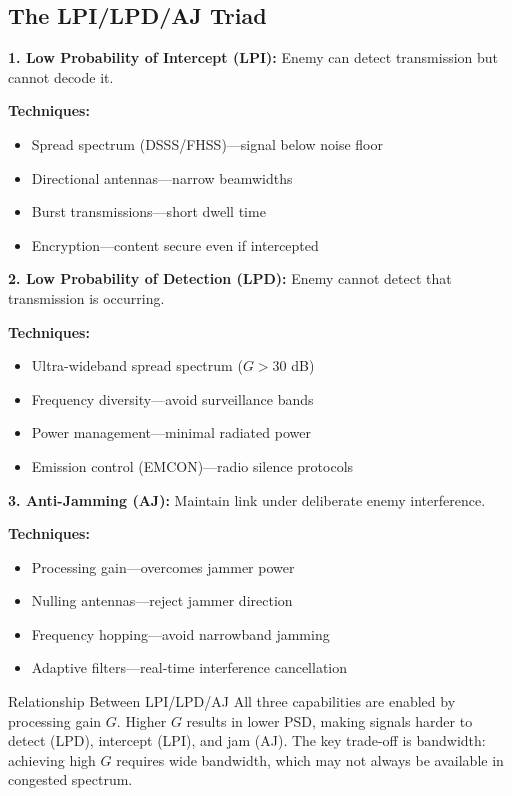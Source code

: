 \subsection{The LPI/LPD/AJ Triad}

\textbf{1. Low Probability of Intercept (LPI):} Enemy can detect transmission but cannot decode it.

\textbf{Techniques:}
\begin{itemize}
\item Spread spectrum (DSSS/FHSS)---signal below noise floor
\item Directional antennas---narrow beamwidths
\item Burst transmissions---short dwell time
\item Encryption---content secure even if intercepted
\end{itemize}

\textbf{2. Low Probability of Detection (LPD):} Enemy cannot detect that transmission is occurring.

\textbf{Techniques:}
\begin{itemize}
\item Ultra-wideband spread spectrum ($G > 30$ dB)
\item Frequency diversity---avoid surveillance bands
\item Power management---minimal radiated power
\item Emission control (EMCON)---radio silence protocols
\end{itemize}

\textbf{3. Anti-Jamming (AJ):} Maintain link under deliberate enemy interference.

\textbf{Techniques:}
\begin{itemize}
\item Processing gain---overcomes jammer power
\item Nulling antennas---reject jammer direction
\item Frequency hopping---avoid narrowband jamming
\item Adaptive filters---real-time interference cancellation
\end{itemize}

\begin{calloutbox}{Relationship Between LPI/LPD/AJ}
All three capabilities are enabled by processing gain $G$. Higher $G$ results in lower PSD, making signals harder to detect (LPD), intercept (LPI), and jam (AJ). The key trade-off is bandwidth: achieving high $G$ requires wide bandwidth, which may not always be available in congested spectrum.
\end{calloutbox}

